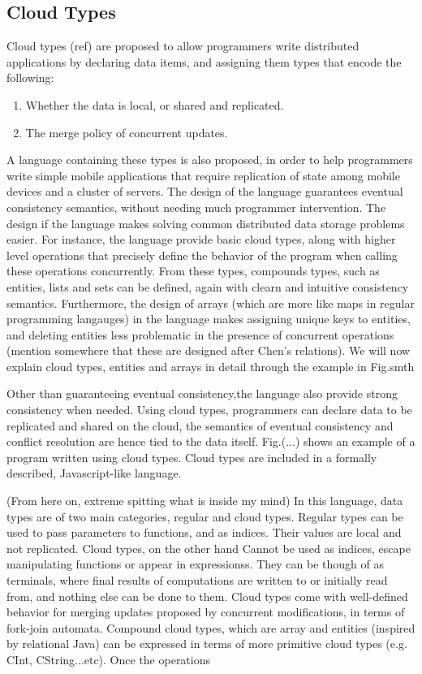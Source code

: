 \subsection{Cloud Types}
Cloud types (ref) are proposed to allow programmers write distributed applications by
declaring data items, and assigning them types that encode the following:
\begin{enumerate}
  \item Whether the data is local, or shared and replicated.
  \item The merge policy of concurrent updates.
\end{enumerate}
A language containing these types is also proposed, in order to help programmers
write simple mobile applications that require replication of state among mobile
devices and a cluster of servers. The design of the language guarantees eventual
consistency semantics, without needing much programmer intervention. The design
if the language makes solving common distributed data storage problems easier.
For instance, the language provide basic cloud types, along with higher level
operations that precisely define the behavior of the program when calling these
operations concurrently. From these types, compounds types, such as entities,
lists and sets can be defined, again with clearn and intuitive consistency
semantics. Furthermore, the design of arrays (which are more like maps in
regular programming langauges) in the language makes assigning
unique keys to entities, and deleting entities less problematic in the presence
of concurrent operations (mention somewhere that these are designed after Chen's
relations). We will now explain cloud types, entities and arrays in detail through
the example in Fig.smth

Other than guaranteeing eventual consistency,the language also provide strong consistency
when needed. Using cloud types, programmers can declare data to be replicated
and shared on the cloud, the semantics of eventual consistency and conflict
resolution are hence tied to the data itself. Fig.(...) shows an example of a
program written using cloud types. Cloud types are included in a formally
described, Javascript-like language.

(From here on, extreme spitting what is inside my mind)
In this language, data types are of two main categories, regular and cloud
types. Regular types can be used to pass parameters to functions, and as
indices. Their values are local and not replicated. Cloud types, on the other
hand Cannot be used as indices, escape manipulating functions or appear in
expressionss. They can be though of as terminals, where final results of
computations are written to or initially read from, and nothing else can be done
to them. Cloud types come with well-defined behavior for merging updates
proposed by concurrent modifications, in terms of fork-join automata. Compound
cloud types, which are array and entities (inspired by relational Java) can be
expressed in terms of more primitive cloud types (e.g. CInt, CString...etc).
Once the operations

